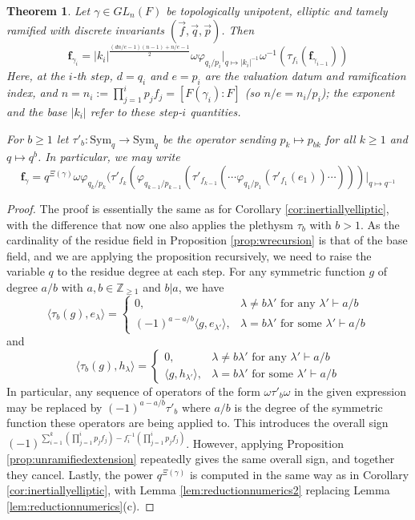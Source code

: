 \documentclass{amsart}
\numberwithin{equation}{section}
\newtheorem{theorem}[lemma]{Theorem}%
\theoremstyle{definition}
\def\Sym{{\mathrm{Sym}}}
\newcommand{\fgamma}{\mathbf{f}_{\gamma}}
\newcommand{\Z}{{\mathbb Z}}
\begin{document}
\begin{theorem}
\label{thm:mainformula}
Let $\gamma\in GL_n(F)$ be topologically unipotent, elliptic and tamely ramified with discrete invariants  $(\vec{f},\vec{q},\vec{p})$. Then
$$\mathbf{f}_{\gamma_{i}}=|k_i|^{\frac{(dn/e-1)(n-1)+n/e-1}{2}}\omega \varphi_{q_i/p_i}|_{q\mapsto |k_i|^{-1}}\omega^{-1}(\tau_{f_i}(\mathbf{f}_{\gamma_{i-1}}))$$ 
Here, at the $i$-th step, $d=q_i$ and $e=p_i$ are the valuation datum and ramification index, and $n=n_i:=\prod_{j=1}^{i}p_jf_j=[F(\gamma_i):F]$ (so $n/e=n_i/p_i$); the exponent and the base $|k_i|$ refer to these step-$i$ quantities.

For $b\geq 1$ let $\tau'_b:\Sym_q\to\Sym_q$ be the operator sending $p_k\mapsto p_{bk}$ for all $k\geq 1$ and $q\mapsto q^b$.
In particular, we may write 
$$\fgamma=q^{\Xi(\gamma)}\omega \varphi_{q_k/p_k}(\tau'_{f_k}(\varphi_{q_{k-1}/p_{k-1}}(\tau'_{f_{k-1}}(\cdots \varphi_{q_1/p_1}(\tau'_{f_1}(e_1))\cdots)))|_{q\mapsto q^{-1}}$$
\end{theorem}
\begin{proof}
    The proof is essentially the same as for Corollary \ref{cor:inertiallyelliptic}, with the difference that now one also applies the plethysm $\tau_b$ with $b>1$. As the cardinality of the residue field in Proposition \ref{prop:wrecursion} is that of the base field, and we are applying the proposition recursively, we need to raise the variable $q$ to the residue degree at each step. For any symmetric function $g$ of degree $a/b$ with $a,b\in \Z_{\geq 1}$ and $b|a$, we have
    $$\langle \tau_b(g), e_\lambda \rangle =\begin{cases}
        0, & \lambda\neq b \lambda' \text{ for any } \lambda'\vdash a/b\\
        (-1)^{a-a/b} \langle g, e_{\lambda'}\rangle, & \lambda=b\lambda' \text{ for some } \lambda' \vdash a/b
    \end{cases}$$
    and $$\langle \tau_b(g), h_\lambda \rangle =\begin{cases}
        0, & \lambda\neq b \lambda' \text{ for any } \lambda'\vdash a/b\\
        \langle g, h_{\lambda'}\rangle, & \lambda=b\lambda' \text{ for some } \lambda' \vdash a/b
    \end{cases}$$
    In particular, any sequence of operators of the form $\omega \tau'_b \omega$ in the given expression may be replaced by $(-1)^{a-a/b}\tau'_b$ where $a/b$ is the degree of the symmetric function these operators are being applied to.
    This introduces the overall sign $(-1)^{\sum_{i=1}^{k} (\prod_{j=1}^i p_jf_j)-f_i^{-1}(\prod_{j=1}^{i}p_jf_j)}$. 
    However, applying Proposition \ref{prop:unramifiedextension} repeatedly gives the same overall sign, and together they cancel.
    Lastly, the power $q^{\Xi(\gamma)}$ is computed in the same way as in Corollary \ref{cor:inertiallyelliptic}, with Lemma \ref{lem:reductionnumerics2} replacing Lemma \ref{lem:reductionnumerics}(c).
\end{proof}
\end{document}
